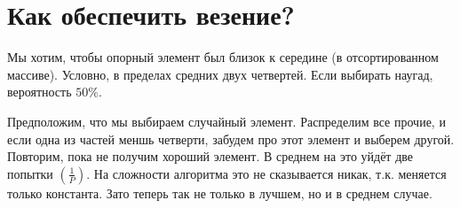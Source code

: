 \documentclass[12pt, a4paper]{article}
\begin{document}
\section*{Как обеспечить везение?}

Мы хотим, чтобы опорный элемент был близок к середине (в отсортированном массиве). Условно, в пределах средних двух четвертей. Если выбирать наугад, вероятность $50\%$.

Предположим, что мы выбираем случайный элемент. Распределим все прочие, и если одна из частей меншь четверти, забудем про этот элемент и выберем другой. Повторим, пока не получим хороший элемент. В среднем на это уйдёт две попытки $\left( \frac1P \right)$. На сложности алгоритма это не сказывается никак, т.к. меняется только константа. Зато теперь так не только в лучшем, но и в среднем случае.
\end{document}
